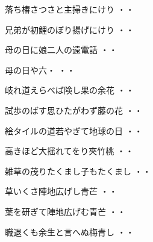 \begin{shiika}落ち椿さつさと主掃きにけり
\hfill{・・}\end{shiika}
\vspace{0.4cm}
\begin{shiika}兄弟が初鯉のぼり揚げにけり
\hfill{・・}\end{shiika}
\vspace{0.4cm}
\begin{shiika}母の日に娘二人の遠電話
\hfill{・・}\end{shiika}
\vspace{0.4cm}
\begin{shiika}母の日や六・
\hfill{・・}\end{shiika}
\vspace{0.4cm}
\begin{shiika}岐れ道えらべば険し果の余花
\hfill{・・}\end{shiika}
\vspace{0.4cm}
\begin{shiika}試歩のばす思ひたがわず藤の花
\hfill{・・}\end{shiika}
\vspace{0.4cm}
\begin{shiika}絵タイルの道若やぎて地球の日
\hfill{・・}\end{shiika}
\vspace{0.4cm}
\begin{shiika}高きほど大揺れてをり夾竹桃
\hfill{・・}\end{shiika}
\vspace{0.4cm}
\begin{shiika}雑草の茂りたくまし子もたくまし
\hfill{・・}\end{shiika}
\vspace{0.4cm}
\begin{shiika}草いくさ陣地広げし青芒
\hfill{・・}\end{shiika}
\vspace{0.4cm}
\begin{shiika}葉を研ぎて陣地広げむ青芒
\hfill{・・}\end{shiika}
\vspace{0.4cm}
\begin{shiika}職退くも余生と言へぬ梅青し
\hfill{・・}\end{shiika}
